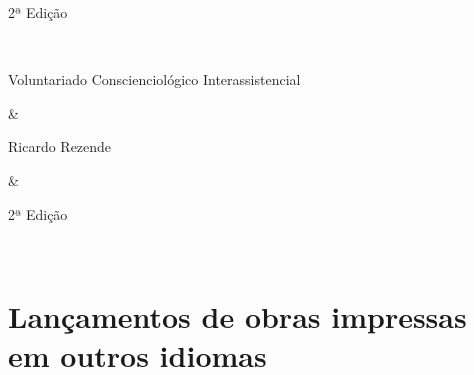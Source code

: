 \documentclass{gescons}
\begin{document}
\begin{longtable}[]
\begin{minipage}[b]{\linewidth}
2ª Edição
\end{minipage} \\
\hline
\begin{minipage}[b]{\linewidth}\raggedright
Voluntariado Conscienciológico Interassistencial
\end{minipage} & \begin{minipage}[b]{\linewidth}\raggedright
Ricardo Rezende
\end{minipage} & \begin{minipage}[b]{\linewidth}\raggedright
2ª Edição
\end{minipage} \\
\midrule\noalign{}
\endhead
\bottomrule\noalign{}
\endlastfoot
\end{longtable}

\clearpage
{}
\section*{Lançamentos de obras impressas em outros idiomas}
\end{document}
